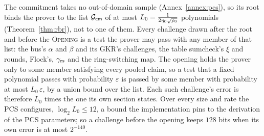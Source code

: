 The commitment takes no out-of-domain sample (Annex~\ref{annex:pcs}), so its root binds the prover to the list $\mathcal{G}_{\mathsf{cm}}$ of at most $L_0=\tfrac{1}{2\eta_0\sqrt{\rho_0}}$ polynomials (Theorem~\ref{thm:rbr}), not to one of them. Every challenge drawn after the root and before the \textsc{Opening} is a test the prover may pass with any member of that list: the bus's $\alpha$ and $\beta$ and its GKR's challenges, the table sumcheck's $\xi$ and rounds, Flock's, $\gamma_{\mathrm{rs}}$ and the ring-switching map. The opening holds the prover only to some member satisfying every pooled claim, so a test that a fixed polynomial passes with probability $\varepsilon$ is passed by some member with probability at most $L_0\,\varepsilon$, by a union bound over the list. Each such challenge's error is therefore $L_0$ times the one its own section states. Over every size and rate the PCS configures, $\log_2L_0\le12$, a bound the implementation pins to the derivation of the PCS parameters; so a challenge before the opening keeps $128$ bits when its own error is at most $2^{-140}$.

